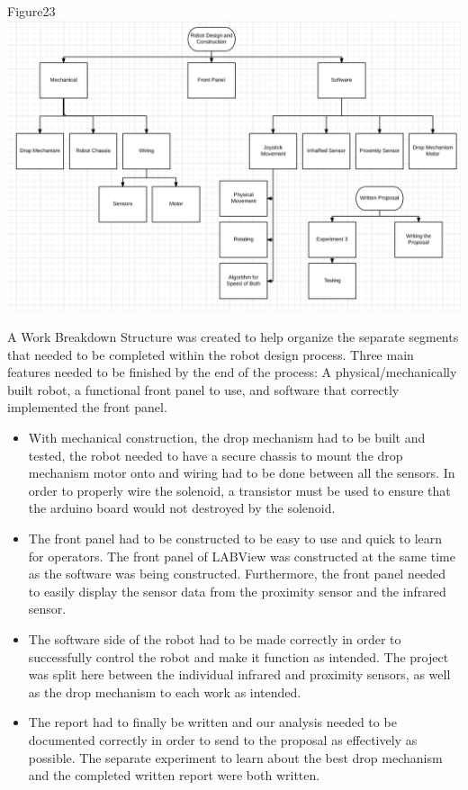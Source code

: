\documentclass{article}
\begin{document}
\begin{center}{Figure23 \includegraphics[width=\textwidth]{WorkBreakdown.png}}\end{center}
    A Work Breakdown Structure was created to help organize the separate segments that needed to be completed within the robot design process. Three main features needed to be finished by the end of the process: A physical/mechanically built robot, a functional front panel to use, and software that correctly implemented the front panel. 
    \begin{itemize}
        \item With mechanical construction, the drop mechanism had to be built and tested, the robot needed to have a secure chassis to mount the drop mechanism motor onto and wiring had to be done between all the sensors. In order to properly wire the solenoid, a transistor must be used to ensure that the arduino board would not destroyed by the solenoid.
        \item The front panel had to be constructed to be easy to use and quick to learn for operators. The front panel of LABView was constructed at the same time as the software was being constructed. Furthermore, the front panel needed to easily display the sensor data from the proximity sensor and the infrared sensor.
        \item The software side of the robot had to be made correctly in order to successfully control the robot and make it function as intended. The project was split here between the individual infrared and proximity sensors, as well as the drop mechanism to each work as intended.
        \item The report had to finally be written and our analysis needed to be documented correctly in order to send to the proposal as effectively as possible. The separate experiment to learn about the best drop mechanism and the completed written report were both written. 
    \end{itemize}
\end{document}
